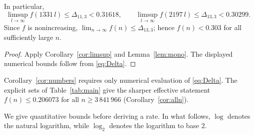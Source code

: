 \documentclass[12pt]{article}
\begin{document}
\begin{corollary}\label{cor:numbers}
In particular,
\[
\limsup_{l\to\infty}f(1331\,l)\le\Delta_{11,3}<0.31618,\qquad
\limsup_{l\to\infty}f(2197\,l)\le\Delta_{13,3}<0.30299.
\]
Since $f$ is nonincreasing, $\lim_{n\to\infty}f(n)\le\Delta_{13,3}$; hence
$f(n)<0.303$ for all sufficiently large $n$.
\end{corollary}
\begin{proof}
Apply Corollary~\ref{cor:limsup} and Lemma~\ref{lem:mono}.
The displayed numerical bounds follow from \eqref{eq:Delta}.
\end{proof}
Corollary~\ref{cor:numbers} requires only numerical evaluation of \eqref{eq:Delta}.
The explicit sets of
Table~\ref{tab:main} give the sharper effective statement
$f(n)\le0.206073$ for all $n\ge3\,841\,966$ (Corollary~\ref{cor:alln}).

We give quantitative bounds before deriving a rate. In what follows, $\log$
denotes the natural logarithm, while $\log_2$ denotes the logarithm to base $2$.
\end{document}
